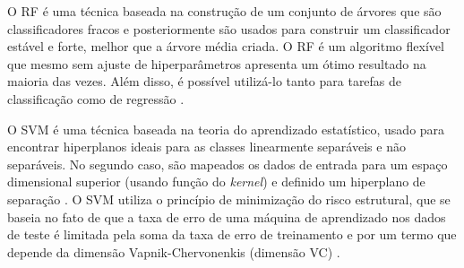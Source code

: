 
O RF é uma técnica baseada na construção de um conjunto de árvores que são classificadores fracos e posteriormente são usados para construir um classificador estável e forte, melhor que a árvore média criada. O RF é um algoritmo flexível que mesmo sem ajuste de hiperparâmetros apresenta um ótimo resultado na maioria das vezes. Além disso, é possível utilizá-lo tanto para tarefas de classificação como de regressão \cite{breiman2001random}. 
    
O SVM é uma técnica baseada na teoria do aprendizado estatístico, usado para encontrar hiperplanos ideais para as classes linearmente separáveis e não separáveis. No segundo caso, são mapeados os dados de entrada para um espaço dimensional superior (usando função do \textit{kernel}) e definido um hiperplano de separação \cite{vapnik1998statistical}. O SVM utiliza o princípio de minimização do risco estrutural, que se baseia no fato de que a taxa de erro de uma máquina de aprendizado nos dados de teste é limitada pela soma da taxa de erro de treinamento e por um termo que depende da dimensão Vapnik-Chervonenkis (dimensão VC) \cite{zhuang2006parameter}.
    
    

